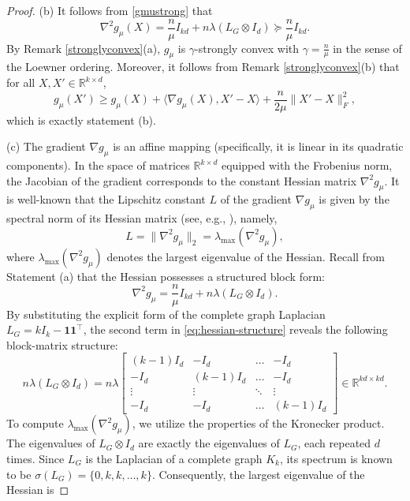 \documentclass[11pt]{article}
\theoremstyle{definition}
\newcommand{\R}{\mathbb{R}}
\newcommand{\1}{\mathbf{1}}
\begin{document}
\begin{proof}
\noindent (b) It follows from \eqref{gmustrong} that
$$\nabla^2 g_\mu(X)
= \frac{n}{\mu} I_{kd} + n\lambda (L_G \otimes I_d)
\succeq \frac{n}{\mu} I_{kd}.$$
By Remark \ref{stronglyconvex}(a),  $g_\mu$ is $\gamma$-strongly convex with $\gamma = \frac{n}{\mu}$ in the sense of the Loewner ordering. 
Moreover, it follows from Remark \ref{stronglyconvex}(b) that for all $X, X' \in \R^{k\times d}$, 
\[
g_\mu(X') \ge g_\mu(X) + \langle \nabla g_\mu(X), X'-X \rangle + \frac{n}{2\mu}\|X'-X\|_F^2,
\]
which is exactly statement (b).

\medskip
\noindent (c) The gradient $\nabla g_\mu$ is an affine mapping (specifically, it is linear in its quadratic components). In the space of matrices $\mathbb{R}^{k \times d}$ equipped with the Frobenius norm, the Jacobian of the gradient corresponds to the constant Hessian matrix $\nabla^2 g_\mu$. It is well-known that the Lipschitz constant $L$ of the gradient $\nabla g_\mu$ is given by the spectral norm of its Hessian matrix (see, e.g., \cite{boyd2004convex}), namely, 
$$L = \|\nabla^2 g_\mu\|_2 = \lambda_{\max}(\nabla^2 g_\mu),$$
where $\lambda_{\max}(\nabla^2 g_\mu)$ denotes the largest eigenvalue of the Hessian.
Recall from Statement (a) that the Hessian possesses a structured block form:
\begin{equation}\label{eq:hessian-structure}
\nabla^2 g_\mu = \frac{n}{\mu} I_{kd} + n\lambda (L_G \otimes I_d).
\end{equation}
By substituting the explicit form of the complete graph Laplacian $L_G = k I_k - \mathbf{1}\mathbf{1}^\top$, the second term in \eqref{eq:hessian-structure} reveals the following block-matrix structure:
\begin{equation*}
n\lambda (L_G \otimes I_d) = n\lambda 
\begin{bmatrix}
(k-1)I_d & -I_d & \dots & -I_d \\
-I_d & (k-1)I_d & \dots & -I_d \\
\vdots & \vdots & \ddots & \vdots \\
-I_d & -I_d & \dots & (k-1)I_d
\end{bmatrix} \in \mathbb{R}^{kd \times kd}.
\end{equation*}
To compute $\lambda_{\max}(\nabla^2 g_\mu)$, we utilize the properties of the Kronecker product. The eigenvalues of $L_G \otimes I_d$ are exactly the eigenvalues of $L_G$, each repeated $d$ times. Since $L_G$ is the Laplacian of a complete graph $K_k$, its spectrum is known to be $\sigma(L_G) = \{0, k, k, \dots, k\}$. Consequently, the largest eigenvalue of the Hessian is

\end{proof}
\end{document}
